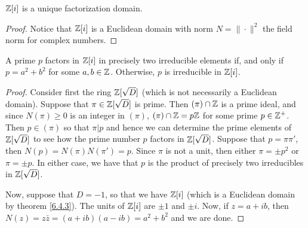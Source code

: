 \begin{theorem}\label{proposition_6.4.3}
  $\mathbb{Z}[i]$ is a unique factorization domain.
\end{theorem}
\begin{proof}
  Notice that $\mathbb{Z}[i]$ is a Euclidean domain with norm $N=\|\cdot\|^2$ the
  field norm for complex numbers.
\end{proof}
\begin{corollary}
  A prime $p$ factors in  $\mathbb{Z}[i]$ in precisely two irreducible elements if,
  and only if $p=a^2+b^2$ for some  $a,b \in \mathbb{Z}$. Otherwise,  $p$ is
  irreducible in  $\mathbb{Z}[i]$.
\end{corollary}
\begin{proof}
  Consider first the ring $\mathbb{Z}[\sqrt{D}]$ (which is not necessarily a Euclidean
  domain). Suppose that $\pi \in \mathbb{Z}[\sqrt{D}]$ is prime. Then $(\pi) \cap \mathbb{Z}$
  is a prime ideal, and since $N(\pi) \geq 0$ is an integer in $(\pi)$, $(\pi)
  \cap \mathbb{Z}=p\mathbb{Z}$ for some prime $p \in \mathbb{Z}^+$. Then  $p \in (\pi)$ so that
  $\pi|p$ and hence we can determine the prime elements of  $\mathbb{Z}[\sqrt{D}]$ to
  see how the prime number $p$ factors in $\mathbb{Z}[\sqrt{D}]$. Suppose that
  $p=\pi\pi'$, then  $N(p)=N(\pi)N(\pi')=p$. Since $\pi$ is not a unit, then
  either  $\pi=\pm p^2$ or $\pi=\pm p$. In either case, we have that $p$ is
  the product of precisely two irreducibles in $\mathbb{Z}[\sqrt{D}]$.

  Now, suppose that $D=-1$, so that we have  $\mathbb{Z}[i]$ (which is a Euclidean
  domain by theorem \ref{6.4.3}). The units of $\mathbb{Z}[i]$ are $\pm 1$ and  $\pm
  i$. Now, if  $z=a+ib$, then  $N(z)=z\bar{z}=(a+ib)(a-ib)=a^2+b^2$ and we are
  done.
\end{proof}

